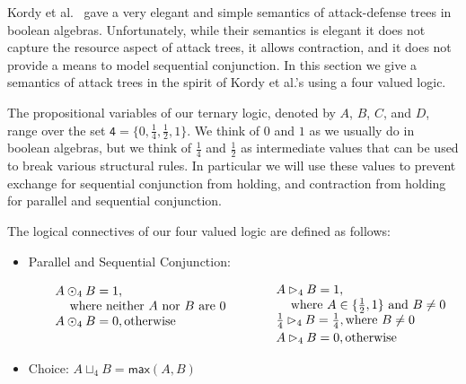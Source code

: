 \newcommand{\forth}{\frac{1}{4}}
\newcommand{\half}{\frac{1}{2}}

Kordy et al.~\cite{Kordy:2012} gave a very elegant and simple
semantics of attack-defense trees in boolean algebras.  Unfortunately,
while their semantics is elegant it does not capture the resource
aspect of attack trees, it allows contraction, and it does not provide
a means to model sequential conjunction.  In this section we give a
semantics of attack trees in the spirit of Kordy et al.'s using a four
valued logic.

The propositional variables of our ternary logic, denoted by $A$, $B$,
$C$, and $D$, range over the set $\mathsf{4} = \{0, \forth, \half,
1\}$.  We think of $0$ and $1$ as we usually do in boolean algebras,
but we think of $\forth$ and $\half$ as intermediate values that can
be used to break various structural rules.  In particular we will use
these values to prevent exchange for sequential conjunction from
holding, and contraction from holding for parallel and sequential
conjunction.
\begin{definition}
  \label{def:logical-connectives}
  The logical connectives of our four valued logic are defined as
  follows:
  \begin{itemize}
  \item[] Parallel and Sequential Conjunction:
    \begin{center}
      \begin{math}
        \setlength{\arraycolsep}{10px}
        \begin{array}{lll}
          \begin{array}{lll}
            A \odot_4 B = 1,\\
            \,\,\,\,\,\,\,\text{where neither $A$ nor $B$ are $0$}\\
          A \odot_4 B = 0, \text{otherwise}\\
          \\
        \end{array}
        &
        \begin{array}{lll}          
          A \rhd_4 B = 1,\\
          \,\,\,\,\,\,\,\text{where } A \in \{\half, 1\} \text{ and } B \neq 0\\
          \forth \rhd_4 B = \forth, \text{where $B \neq 0$}\\[2px]         
          A \rhd_4 B = 0, \text{otherwise}
        \end{array}
        \end{array}
      \end{math}
    \end{center}
  \item[] Choice: $A \sqcup_4 B = \mathsf{max}(A,B)$    
  \end{itemize}
\end{definition}
